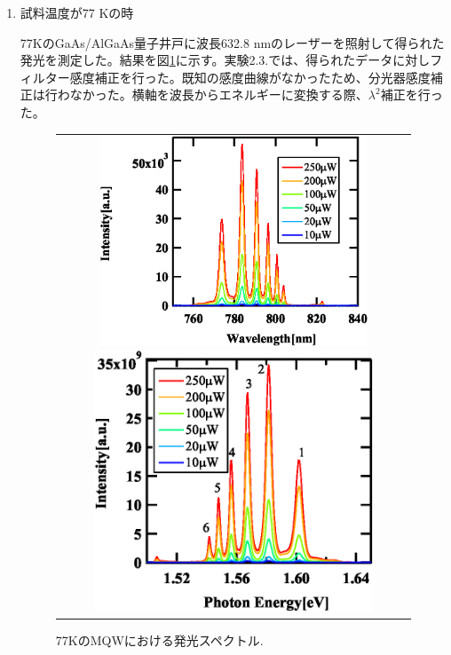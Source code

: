 \documentclass[11pt,a4j]{jsarticle}
\begin{document}
\begin{enumerate}
       \newpage
 \item 試料温度が77 Kの時

       77KのGaAs/AlGaAs量子井戸に波長632.8 nmのレーザーを照射して得られた発光を測定した。結果を図\ref{fig_mqw_77_spec1}に示す。実験2.3.では、得られたデータに対しフィルター感度補正を行った。既知の感度曲線がなかったため、分光器感度補正は行わなかった。横軸を波長からエネルギーに変換する際、$\lambda^2$補正を行った。


       \begin{figure}[ht]
        \centering
        \begin{tabular}{c}

         \begin{minipage}{0.52\hsize}

          \includegraphics[clip,width=8cm]{start2_MQW_77K_Spectrum_wav.eps}
         \end{minipage}

         \begin{minipage}{0.06\hsize}%
          \hspace{5mm}
         \end{minipage}

         \begin{minipage}{0.5\hsize}
          \centering
          \includegraphics[clip,width=8.3cm]{start2_MQW_77K_Spectrum_eV.eps}
         \end{minipage}
        \end{tabular}
        \caption{77KのMQWにおける発光スペクトル.}
        \label{fig_mqw_77_spec1}


\end{figure}
\end{enumerate}
\end{document}
